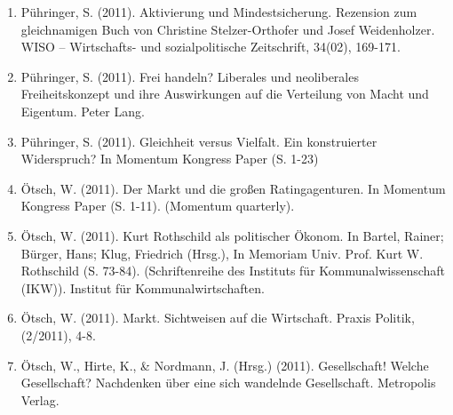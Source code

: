 \begin{enumerate}
	 \item Pühringer, S. (2011). Aktivierung und Mindestsicherung. Rezension zum gleichnamigen Buch von Christine Stelzer-Orthofer und Josef Weidenholzer. WISO -- Wirtschafts- und sozialpolitische Zeitschrift, 34(02), 169-171.
	 \item Pühringer, S. (2011). Frei handeln? Liberales und neoliberales Freiheitskonzept und ihre Auswirkungen auf die Verteilung von Macht und Eigentum. Peter Lang.
	 \item Pühringer, S. (2011). Gleichheit versus Vielfalt. Ein konstruierter Widerspruch? In Momentum Kongress Paper (S. 1-23)
	 \item Ötsch, W. (2011). Der Markt und die großen Ratingagenturen. In Momentum Kongress Paper (S. 1-11). (Momentum quarterly).
	 \item Ötsch, W. (2011). Kurt Rothschild als politischer Ökonom. In Bartel, Rainer; Bürger, Hans; Klug, Friedrich (Hrsg.), In Memoriam Univ. Prof. Kurt W. Rothschild (S. 73-84). (Schriftenreihe des Instituts für Kommunalwissenschaft (IKW)). Institut für Kommunalwirtschaften.
	 \item Ötsch, W. (2011). Markt. Sichtweisen auf die Wirtschaft. Praxis Politik, (2/2011), 4-8.
	 \item Ötsch, W., Hirte, K., \& Nordmann, J. (Hrsg.) (2011). Gesellschaft! Welche Gesellschaft? Nachdenken über eine sich wandelnde Gesellschaft. Metropolis Verlag.
\end{enumerate}
